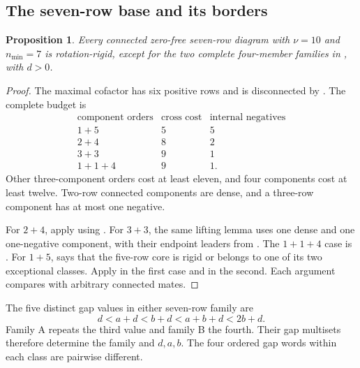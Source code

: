 \documentclass[11pt,a4paper]{amsart}
\numberwithin{equation}{section}
\theoremstyle{plain}
\newtheorem{proposition}[theorem]{Proposition}
\theoremstyle{definition}
\begin{document}
\subsection{The seven-row base and its borders}

\begin{proposition}\label{prop:ten-negative-base}
Every connected zero-free seven-row diagram with \(\nu=10\) and
\(n_{\min}=7\) is rotation-rigid, except for the two complete
four-member families in , with \(d>0\).
\end{proposition}

\begin{proof}
The maximal cofactor has six positive rows and is disconnected by
.  The complete budget is
\begin{equation}\label{eq:ten-negative-budget}
 \begin{array}{c|c|c}
 \text{component orders}&\text{cross cost}&\text{internal negatives}\\\hline
 1+5&5&5\\
 2+4&8&2\\
 3+3&9&1\\
 1+1+4&9&1.
 \end{array}
\end{equation}
Other three-component orders cost at least eleven, and four components
cost at least twelve.  Two-row connected components are dense, and a
three-row component has at most one negative.

For \(2+4\), apply  using
.
For \(3+3\), the same lifting lemma uses one dense and one one-negative
component, with their endpoint leaders from
.  The \(1+1+4\) case is
.
For \(1+5\),  says that the five-row core is
rigid or belongs to one of its two exceptional classes.  Apply
 in the first case and
 in the second.
Each argument compares with arbitrary connected mates.
\end{proof}

The five distinct gap values in either seven-row family are
\[
 d<a+d<b+d<a+b+d<2b+d.
\]
Family A repeats the third value and family B the fourth.  Their gap
multisets therefore determine the family and \(d,a,b\).  The four
ordered gap words within each class are pairwise different.
\end{document}
